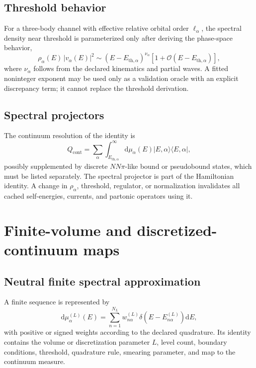 \documentclass[11pt]{article}
\newcommand{\dd}{\mathrm{d}}
\newcommand{\cO}{\mathcal O}
\newcommand{\abs}[1]{\left|#1\right|}
\begin{document}
\subsection{Threshold behavior}

For a three-body channel with effective relative orbital order \(\ell_\alpha\),
the spectral density near threshold is parameterized only after deriving the
phase-space behavior,
\begin{equation}
 \rho_\alpha(E)\,
 \abs{v_\alpha(E)}^2
 \sim
 (E-E_{\mathrm{th},\alpha})^{\nu_\alpha}
 \left[1+\cO(E-E_{\mathrm{th},\alpha})\right],
 \label{eq:threshold-law}
\end{equation}
where \(\nu_\alpha\) follows from the declared kinematics and partial waves.
A fitted noninteger exponent may be used only as a validation oracle with an
explicit discrepancy term; it cannot replace the threshold derivation.

\subsection{Spectral projectors}

The continuum resolution of the identity is
\begin{equation}
 Q_{\mathrm{cont}}
 =
 \sum_\alpha
 \int_{E_{\mathrm{th},\alpha}}^\infty
 \dd\mu_\alpha(E)
 |E,\alpha\rangle\langle E,\alpha|,
 \label{eq:spectral-projector}
\end{equation}
possibly supplemented by discrete \(NN\pi\)-like bound or pseudobound states,
which must be listed separately.  The spectral projector is part of the
Hamiltonian identity.  A change in \(\rho_\alpha\), threshold, regulator, or
normalization invalidates all cached self-energies, currents, and partonic
operators using it.

\section{Finite-volume and discretized-continuum maps}
\label{sec:finite-volume}

\subsection{Neutral finite spectral approximation}

A finite sequence is represented by
\begin{equation}
 \dd\mu_\alpha^{(L)}(E)
 =
 \sum_{n=1}^{N_L}
 w_{n\alpha}^{(L)}
 \delta\!\left(E-E_{n\alpha}^{(L)}\right)\dd E,
 \label{eq:finite-measure}
\end{equation}
with positive or signed weights according to the declared quadrature.  Its
identity contains the volume or discretization parameter \(L\), level count,
boundary conditions, threshold, quadrature rule, smearing parameter, and map
to the continuum measure.
\end{document}
